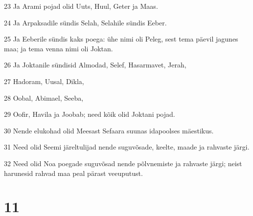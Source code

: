 \par 23 Ja Arami pojad olid Uuts, Huul, Geter ja Maas.
\par 24 Ja Arpaksadile sündis Selah, Selahile sündis Eeber.
\par 25 Ja Eeberile sündis kaks poega: ühe nimi oli Peleg, sest tema päevil jagunes maa; ja tema venna nimi oli Joktan.
\par 26 Ja Joktanile sündisid Almodad, Selef, Hasarmavet, Jerah,
\par 27 Hadoram, Uusal, Dikla,
\par 28 Oobal, Abimael, Seeba,
\par 29 Oofir, Havila ja Joobab; need kõik olid Joktani pojad.
\par 30 Nende elukohad olid Meesast Sefaara suunas idapoolses mäestikus.
\par 31 Need olid Seemi järeltulijad nende suguvõsade, keelte, maade ja rahvaste järgi.
\par 32 Need olid Noa poegade suguvõsad nende põlvnemiste ja rahvaste järgi; neist harunesid rahvad maa peal pärast veeuputust.

\chapter{11}

